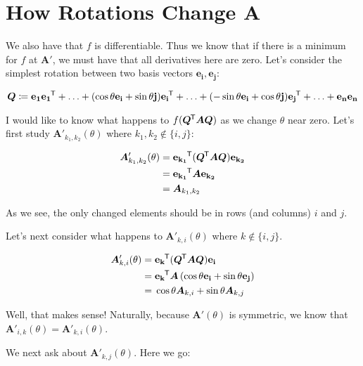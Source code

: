 \documentclass[11pt, oneside]{amsart}
\newcommand{\mtx}[1]{\bm{#1}}
\newcommand*{\tran}{^{\mkern-1.5mu\mathsf{T}}}
\renewcommand{\vec}[1]{\mathbf{#1}}
\newcommand{\bvec}[1]{\vec{e_{#1}}}
\newcommand{\mtxA}{\mtx{A}}
\newcommand{\mtxQ}{\mtx{Q}}
\begin{document}
\section{How Rotations Change $\mtxA$}

We also have that $f$ is differentiable. Thus we know that if there is a
minimum for $f$ at $\mtxA'$, we must have that all derivatives here are
zero. Let's consider the simplest rotation between two basis vectors
$\bvec{i}, \bvec{j}$:

\[
  \mtxQ \coloneqq
    \bvec{1}\bvec{1}\tran
    + \ldots + (\cos\theta \bvec{i} + \sin\theta \vec{j}) \bvec{i}\tran
    + \ldots + (-\sin\theta \bvec{i} + \cos\theta \vec{j}) \bvec{j}\tran
    + \ldots + \bvec{n}\bvec{n}
\]

I would like to know what happens to $f(\mtxQ\tran \mtxA \mtxQ)$ as we
change $\theta$ near zero. Let's first study $\mtxA'_{k_1, k_2}(\theta)$
where $k_1, k_2 \not\in \{ i, j \}$:

\begin{equation*}
  \begin{split}
    \mtxA'_{k_1, k_2}(\theta)
      ={}& \bvec{k_1}\tran (\mtxQ\tran \mtxA \mtxQ) \bvec{k_2} \\
      ={}& \bvec{k_1}\tran \mtxA \bvec{k_2} \\
      ={}& \mtxA_{k_1, k_2}
  \end{split}
\end{equation*}

As we see, the only changed elements should be in rows (and columns) $i$
and $j$.

Let's next consider what happens to $\mtxA'_{k, i}(\theta)$ where $k
\not\in \{i, j\}$.

\begin{equation*}
  \begin{split}
    \mtxA'_{k, i}(\theta)
      ={}& \bvec{k}\tran (\mtxQ\tran \mtxA \mtxQ) \bvec{i} \\
      ={}& \bvec{k}\tran \mtxA \left(
        \cos\theta \bvec{i} + \sin\theta \bvec{j}
      \right) \\
      ={}& \cos\theta \mtxA_{k, i} + \sin\theta \mtxA_{k, j}
  \end{split}
\end{equation*}

Well, that makes sense! Naturally, because $\mtxA'(\theta)$ is
symmetric, we know that $\mtxA'_{i, k}(\theta) = \mtxA'_{k, i}(\theta)$.

We next ask about $\mtxA'_{k, j}(\theta)$. Here we go:
\end{document}
